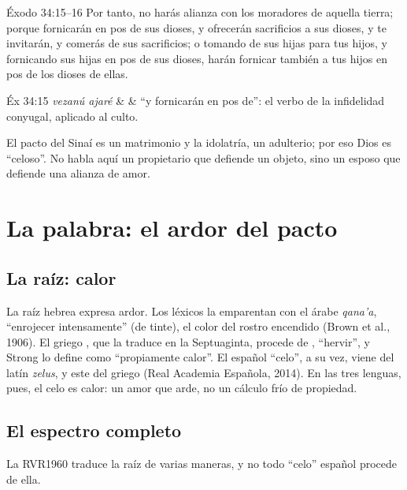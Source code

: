 \begin{verso}{Éxodo 34:15–16}
Por tanto, no harás alianza con los moradores de aquella tierra; porque fornicarán en pos de sus dioses, y ofrecerán sacrificios a sus dioses, y te invitarán, y comerás de sus sacrificios; o tomando de sus hijas para tus hijos, y fornicando sus hijas en pos de sus dioses, harán fornicar también a tus hijos en pos de los dioses de ellas.
\end{verso}

\begin{filologia}{Éx 34:15}
 \emph{vezanú ajaré} &  & ``y fornicarán en pos de'': el verbo de la infidelidad conyugal, aplicado al culto. \\
\end{filologia}

El pacto del Sinaí es un matrimonio y la idolatría, un adulterio; por eso Dios es ``celoso''. No habla aquí un propietario que defiende un objeto, sino un esposo que defiende una alianza de amor.

\section{La palabra: el ardor del pacto}

\subsection{La raíz: calor}
La raíz hebrea  expresa ardor. Los léxicos la emparentan con el árabe \emph{qana'a}, ``enrojecer intensamente'' (de tinte), el color del rostro encendido (Brown et al., 1906). El griego , que la traduce en la Septuaginta, procede de , ``hervir'', y Strong lo define como ``propiamente calor''. El español ``celo'', a su vez, viene del latín \emph{zelus}, y este del griego (Real Academia Española, 2014). En las tres lenguas, pues, el celo es calor: un amor que arde, no un cálculo frío de propiedad.


\subsection{El espectro completo}
La RVR1960 traduce la raíz de varias maneras, y no todo ``celo'' español procede de ella.

